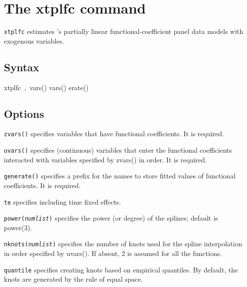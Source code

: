 
\section{The xtplfc command}
{\tt xtplfc} estimates \citeauthor{yonghong2016semiparametric}'s \citeyearpar{yonghong2016semiparametric} partially linear functional-coefficient panel data models with exogenous variables.

\subsection{Syntax}
\begin{stsyntax}
	xtplfc\
	\varlist,\
	vars(\varlist)
	vars(\varlist)
	erate(\ststring)
\end{stsyntax}


\subsection{Options}

\hangpara
{\tt zvars(\varlist)} specifies variables that have functional coefficients. It is required.

\hangpara
{\tt uvars(\varlist)} specifies (continuous) variables that enter the functional coefficients interacted with variables
specified by zvars() in order. It is required.

\hangpara
{\tt generate(\ststring)} specifies a prefix for the names to store fitted values of functional coefficients. It is required.

\hangpara
{\tt te} specifies including time fixed effects.

\hangpara
{\tt power(\textit{numlist})} specifies the power (or degree) of the splines; default is power(3).

\hangpara
{\tt nknots(\textit{numlist})} specifies the number of knots used for the spline interpolation in order specified by uvars().  If
absent, 2 is assumed for all the functions.

\hangpara
{\tt quantile} specifies creating knots based on empirical quantiles. By default, the knots are generated by the rule of
equal space.

